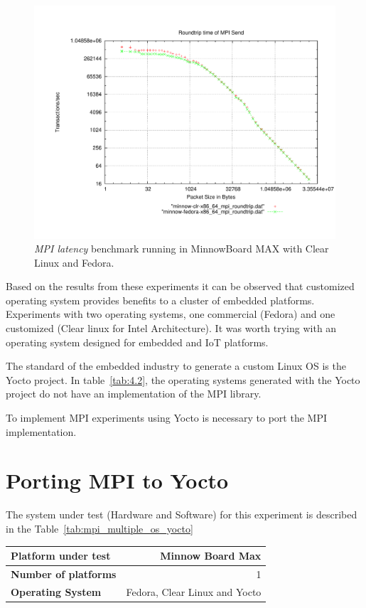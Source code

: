 \begin{figure}[H]
\centering
\includegraphics[width=1 \textwidth]{images/mpbench_clr_experiments/mpi_roundtrip.pdf}
\caption{\textit{MPI latency} benchmark running in MinnowBoard MAX with Clear Linux and
Fedora.}
\label{mpi_roundtrip_clr_fedora}
\end{figure}

Based on the results from these experiments it can be observed that customized 
operating system provides benefits to a cluster of embedded platforms. Experiments 
with two operating systems, one commercial (Fedora) and one customized (Clear
linux for Intel Architecture). It was worth trying with an operating system
designed for embedded and IoT platforms. 

The standard of the embedded industry to generate a custom Linux OS
is the Yocto project. In table~\ref{tab:4.2}, the operating systems
generated with the Yocto project do not have an implementation of the MPI
library.

To implement MPI experiments using Yocto is necessary to port the MPI
implementation.


\section{Porting MPI to Yocto}

The system under test (Hardware and Software) for this experiment is described
in the Table~\ref{tab:mpi_multiple_os_yocto}

    \begin{center}
    \begin{tabular}{ | l | r |}
        \hline
        \textbf{Platform under test} & Minnow Board  Max \\ \hline
        \textbf{Number of platforms} & 1  \\ \hline
        \textbf{Operating System} & Fedora, Clear Linux and Yocto  \\ \hline
    \end{tabular}
    \label{tab:mpi_multiple_os_yocto}
    \end{center}

